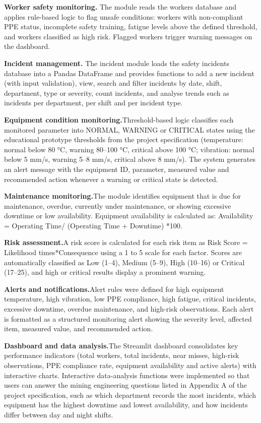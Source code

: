 \documentclass[
]{article}
\begin{document}
\textbf{Worker safety monitoring.} The module reads the workers
database and applies rule-based logic to flag unsafe conditions:
workers with non-compliant PPE status, incomplete safety training,
fatigue levels above the defined threshold, and workers classified
as high risk. Flagged workers trigger warning messages on the
dashboard.

\textbf{Incident management.} The incident module loads the safety
incidents database into a Pandas DataFrame and provides functions to
add a new incident (with input validation), view, search and filter
incidents by date, shift, department, type or severity, count
incidents, and analyse trends such as incidents per department,
per shift and per incident type.

\textbf{Equipment condition monitoring.}Threshold-based logic classifies each monitored parameter into NORMAL, WARNING or CRITICAL states using the educational prototype thresholds from the project specification (temperature: normal below 80 °C, warning 80–100 °C, critical above 100 °C; vibration: normal below 5 mm/s, warning 5–8 mm/s, critical above 8 mm/s). The system generates an alert message with the equipment ID, parameter, measured value and recommended action whenever a warning or critical state is detected.

\textbf{Maintenance monitoring.}The module identifies equipment that is due for maintenance, overdue, currently under maintenance, or showing excessive downtime or low availability. Equipment availability is calculated as:
Availability = Operating Time/ (Operating Time + Downtime) *100.

\textbf{Risk assessment.}A risk score is calculated for each risk item as Risk Score = Likelihood times*Consequence using a 1 to 5 scale for each factor. Scores are automatically classified as Low (1–4), Medium (5–9), High (10–16) or Critical (17–25), and high or critical results display a prominent warning.

\textbf{Alerts and notifications.}Alert rules were defined for high equipment temperature, high vibration, low PPE compliance, high fatigue, critical incidents, excessive downtime, overdue maintenance, and high-risk observations. Each alert is formatted as a structured monitoring alert showing the severity level, affected item, measured value, and recommended action.

\textbf{Dashboard and data analysis.}The Streamlit dashboard consolidates key performance indicators (total workers, total incidents, near misses, high-risk observations, PPE compliance rate, equipment availability and active alerts) with interactive charts. Interactive data-analysis functions were implemented so that users can answer the mining engineering questions listed in Appendix A of the project specification, such as which department records the most incidents, which equipment has the highest downtime and lowest availability, and how incidents differ between day and night shifts.
\end{document}

